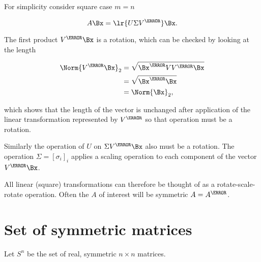 For simplicity consider square case \( m = n \)

\begin{dmath}\label{eqn:convexOptimizationLecture3:100}
A \Bx = \lr{ U \Sigma V^\T } \Bx.
\end{dmath}

The first product \( V^\T \Bx \) is a rotation, which can be checked by looking at the length

\begin{dmath}\label{eqn:convexOptimizationLecture3:120}
\begin{aligned}
\Norm{ V^\T \Bx}_2
&= \sqrt{ \Bx^\T V V^\T \Bx } \\
&= \sqrt{ \Bx^\T \Bx } \\
&= \Norm{ \Bx }_2,
\end{aligned}
\end{dmath}

which shows that the length of the vector is unchanged after application of the linear transformation represented by \( V^\T \) so that operation must be a rotation.

Similarly the operation of \( U \) on \( \Sigma V^\T \Bx \) also must be a rotation.  The operation \( \Sigma = [\sigma_i]_i \) applies a scaling operation to each component of the vector \( V^\T \Bx \).

All linear (square) transformations can therefore be thought of as a rotate-scale-rotate operation.  Often the \( A \) of interest will be symmetric \( A = A^\T \).

\section{Set of symmetric matrices}

Let \( S^n \) be the set of real, symmetric \( n \times n \) matrices.


